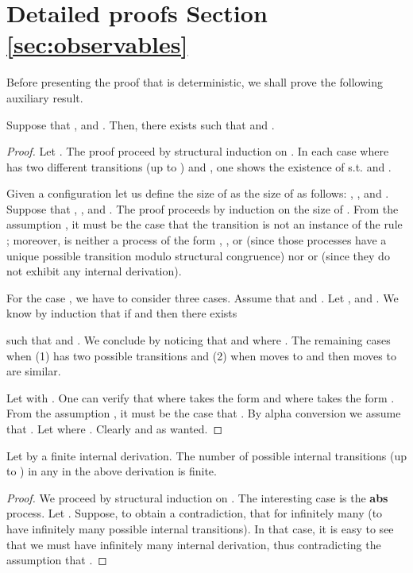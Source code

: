 \documentclass{tlp}
\begin{document}
\section{Detailed proofs Section \ref{sec:observables}} \label{app:sos}
Before presenting the proof that  is deterministic, we shall prove the following auxiliary result. 
\begin{lemma}[Confluence]\label{lemma:confluence}
Suppose that ,
 and .  Then, there exists 
 such that  and . 
\end{lemma}
\begin{proof} 
Let . The proof proceed by structural induction on .  In each case where  has two different transitions  (up to )   and , one shows the existence of  s.t.  and . 

 Given a configuration 
 let us define the size of  as the size of    as follows:
, ,  and .
 Suppose  that , ,  and . 
 The proof proceeds by induction on the size of . 
 From the assumption , it must be the case that the transition  is not an instance of the rule ; moreover, 
    is neither  a process of the form , , 
 or   (since those processes have a unique possible transition modulo structural congruence) nor  or  (since they do not exhibit any internal derivation). 

 For the case , we have to consider three cases.
 Assume that  
 and .
 Let , 
 and
. 
We know by induction that if  and 
  then there exists
 
 such that  and .
We conclude by noticing that   and  where . The  remaining cases when  (1)  has two possible transitions and (2) when  moves to  and then  moves to  are similar. 


Let   with . One can verify that    where  takes the form  and    where  takes the form .  From the assumption , it must be the case that  . By alpha conversion we assume that . 
Let   where .  Clearly    and  as wanted. 
\end{proof}

\begin{observation}\label{obs:finite-traces}
Let   by a finite internal derivation. The 
number of possible internal transitions (up to ) in any  in the above derivation is finite.
\end{observation}
\begin{proof}
We proceed  by structural induction on . The interesting case is the {\bf abs} process. Let . 
Suppose, to obtain a contradiction, that    for infinitely many  (to have infinitely many possible internal transitions). In that case, it is easy to see that  we must have infinitely many internal derivation, thus contradicting the assumption that   . 
\end{proof}
\end{document}

